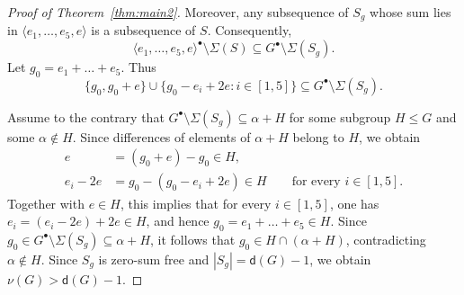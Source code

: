\documentclass[11pt,a4paper]{amsart}
\theoremstyle{plain}
\theoremstyle{definition}
\newcommand{\dd}{\mathsf d}
\begin{document}
\begin{proof}[Proof of Theorem~\ref{thm:main2}]
Moreover, any subsequence of $S_g$ whose sum lies in
$\langle e_1,\ldots,e_5,e\rangle$ is a subsequence of $S$.
Consequently,
\[
\langle e_1,\ldots,e_5,e\rangle^\bullet\setminus\Sigma(S)
\subseteq G^\bullet\setminus\Sigma(S_g).
\]
Let $g_0=e_1+\ldots+e_5$. Thus
$$\{g_0,g_0+e\}
 \cup\{g_0-e_i+2e:i\in[1,5]\}
 \subseteq G^\bullet\setminus\Sigma(S_g).$$

Assume to the contrary that
$G^\bullet\setminus\Sigma(S_g)\subseteq\alpha+H$
for some subgroup $H\le G$ and some $\alpha\notin H$.
Since differences of elements of $\alpha+H$ belong to $H$,
we obtain
\begin{align*}
	e &= (g_0+e)-g_0\in H,\\
	e_i-2e &= g_0-(g_0-e_i+2e)\in H
	\qquad\text{for every }i\in[1,5].
\end{align*}
Together with $e\in H$, this implies that for every $i\in[1,5]$,
one has $e_i=(e_i-2e)+2e\in H$, and hence
$g_0=e_1+\ldots+e_5\in H$.
Since $g_0\in G^\bullet\setminus\Sigma(S_g)\subseteq\alpha+H$,
it follows that $g_0\in H\cap(\alpha+H)$,
contradicting $\alpha\notin H$.
Since $S_g$ is zero-sum free and $|S_g|=\dd(G)-1$, we obtain $\nu(G)>\dd(G)-1$.
\end{proof}
\end{document}
